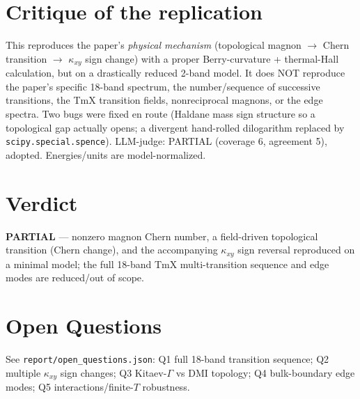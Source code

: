\documentclass[11pt]{article}
\begin{document}
\section{Critique of the replication}
This reproduces the paper's \emph{physical mechanism} (topological magnon $\to$ Chern transition $\to$
$\kappa_{xy}$ sign change) with a proper Berry-curvature + thermal-Hall calculation, but on a drastically
reduced 2-band model. It does NOT reproduce the paper's specific 18-band spectrum, the number/sequence
of successive transitions, the TmX transition fields, nonreciprocal magnons, or the edge spectra.
Two bugs were fixed en route (Haldane mass sign structure so a topological gap actually opens; a
divergent hand-rolled dilogarithm replaced by \texttt{scipy.special.spence}). LLM-judge: PARTIAL
(coverage 6, agreement 5), adopted. Energies/units are model-normalized.

\section{Verdict}
\textbf{PARTIAL} --- nonzero magnon Chern number, a field-driven topological transition (Chern change),
and the accompanying $\kappa_{xy}$ sign reversal reproduced on a minimal model; the full 18-band TmX
multi-transition sequence and edge modes are reduced/out of scope.

\section*{Open Questions}
See \texttt{report/open\_questions.json}: Q1 full 18-band transition sequence; Q2 multiple $\kappa_{xy}$
sign changes; Q3 Kitaev-$\Gamma$ vs DMI topology; Q4 bulk-boundary edge modes; Q5 interactions/finite-$T$
robustness.
\end{document}
